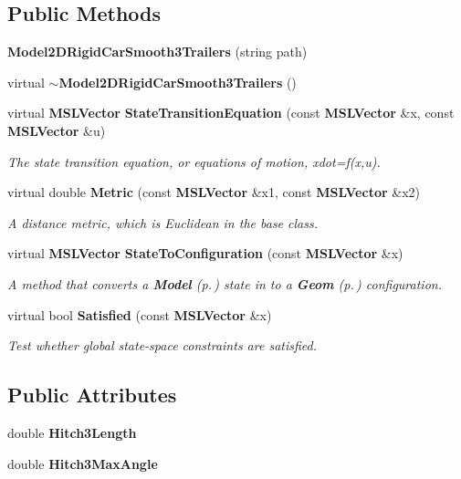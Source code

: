 \subsection*{Public Methods}
\begin{CompactItemize}
\item 
{\bf Model2DRigid\-Car\-Smooth3Trailers} (string path)
\item 
virtual {\bf $\sim$Model2DRigid\-Car\-Smooth3Trailers} ()
\item 
virtual {\bf MSLVector} {\bf State\-Transition\-Equation} (const {\bf MSLVector} \&x, const {\bf MSLVector} \&u)
\begin{CompactList}\small\item\em The state transition equation, or equations of motion, xdot=f(x,u).\item\end{CompactList}\item 
virtual double {\bf Metric} (const {\bf MSLVector} \&x1, const {\bf MSLVector} \&x2)
\begin{CompactList}\small\item\em A distance metric, which is Euclidean in the base class.\item\end{CompactList}\item 
virtual {\bf MSLVector} {\bf State\-To\-Configuration} (const {\bf MSLVector} \&x)
\begin{CompactList}\small\item\em A method that converts a {\bf Model} {\rm (p.\,\pageref{classModel})} state in to a {\bf Geom} {\rm (p.\,\pageref{classGeom})} configuration.\item\end{CompactList}\item 
virtual bool {\bf Satisfied} (const {\bf MSLVector} \&x)
\begin{CompactList}\small\item\em Test whether global state-space constraints are satisfied.\item\end{CompactList}\end{CompactItemize}
\subsection*{Public Attributes}
\begin{CompactItemize}
\item 
double {\bf Hitch3Length}
\item 
double {\bf Hitch3Max\-Angle}
\end{CompactItemize}


